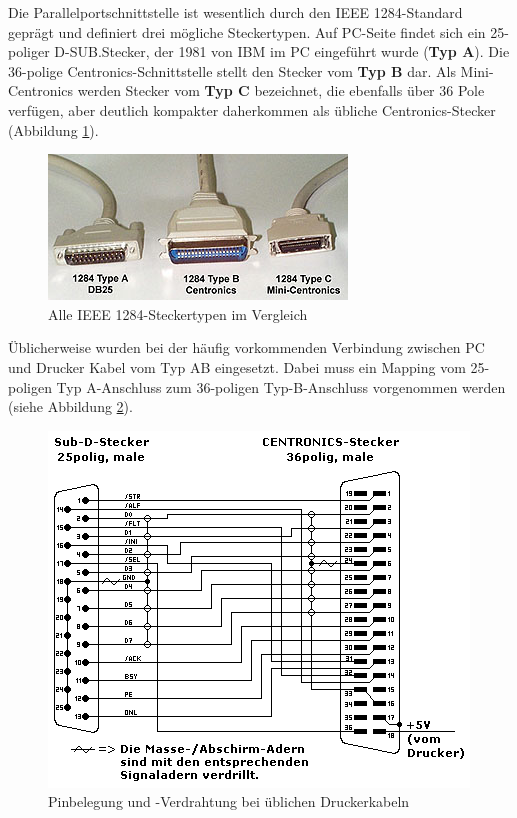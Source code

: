 \documentclass[a4paper,11pt]{article}
\begin{document}
Die Parallelportschnittstelle ist wesentlich durch den IEEE 1284-Standard geprägt und definiert drei mögliche Steckertypen. Auf PC-Seite findet sich ein 25-poliger D-SUB.Stecker, der 1981 von IBM im PC eingeführt wurde (\textbf{Typ A}). Die 36-polige Centronics-Schnittstelle stellt den Stecker vom \textbf{Typ B} dar. Als Mini-Centronics werden Stecker vom \textbf{Typ C} bezeichnet, die ebenfalls über 36 Pole verfügen, aber deutlich kompakter daherkommen als übliche Centronics-Stecker (Abbildung \ref{fig:Alle IEEE 1284-Steckertypen im Vergleich}). 
\newpage
\begin{figure}[h!]
 \centering
 \includegraphics{./pics/ieee1284_types.jpg}
 \caption{Alle IEEE 1284-Steckertypen im Vergleich} 	
  \label{fig:Alle IEEE 1284-Steckertypen im Vergleich}
\end{figure}
\noindent
Üblicherweise wurden bei der häufig vorkommenden Verbindung zwischen PC und Drucker Kabel vom Typ AB eingesetzt. Dabei muss ein Mapping vom 25-poligen Typ A-Anschluss zum 36-poligen Typ-B-Anschluss vorgenommen werden (siehe Abbildung \ref{fig:Pinbelegung und -Verdrahtung bei üblichen Druckerkabeln}).  


\begin{figure}[h!]
 \centering
 \includegraphics[scale=0.7]{./pics/ieee1284_pinbelegungAB.png}
 \caption{Pinbelegung und -Verdrahtung bei üblichen Druckerkabeln} 	
 \label{fig:Pinbelegung und -Verdrahtung bei üblichen Druckerkabeln}
\end{figure} 
\end{document}
